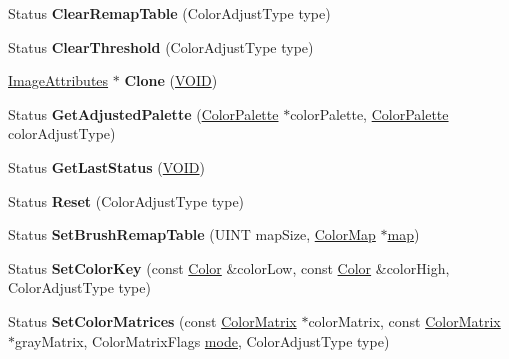 \begin{DoxyCompactItemize}
\mbox{\label{class_image_attributes_a4a15e9e5a04abcd2dfbecfa09874d5a8}} 
Status {\bfseries Clear\+Remap\+Table} (Color\+Adjust\+Type type)
\item 
\mbox{\label{class_image_attributes_a601f2de20c9ddf9874c4c9119f71d0cd}} 
Status {\bfseries Clear\+Threshold} (Color\+Adjust\+Type type)
\item 
\mbox{\label{class_image_attributes_a3e050de95c44a8679f8db5400ccea822}} 
\hyperlink{class_image_attributes}{Image\+Attributes} $\ast$ {\bfseries Clone} (\hyperlink{interfacevoid}{V\+O\+ID})
\item 
\mbox{\label{class_image_attributes_a39f376c67afe6931a408aacba825324c}} 
Status {\bfseries Get\+Adjusted\+Palette} (\hyperlink{struct_color_palette}{Color\+Palette} $\ast$color\+Palette, \hyperlink{struct_color_palette}{Color\+Palette} color\+Adjust\+Type)
\item 
\mbox{\label{class_image_attributes_a3f734c8d14814d0e84504d5a589ead19}} 
Status {\bfseries Get\+Last\+Status} (\hyperlink{interfacevoid}{V\+O\+ID})
\item 
\mbox{\label{class_image_attributes_a0e9d0061a0db770ee5ba42a024e99533}} 
Status {\bfseries Reset} (Color\+Adjust\+Type type)
\item 
\mbox{\label{class_image_attributes_a681f1463a75d1dfafb1dde0d7cea5cfc}} 
Status {\bfseries Set\+Brush\+Remap\+Table} (U\+I\+NT map\+Size, \hyperlink{struct_color_map}{Color\+Map} $\ast$\hyperlink{classmap}{map})
\item 
\mbox{\label{class_image_attributes_ad6ed9de7d729a234f518ab4b53ccccba}} 
Status {\bfseries Set\+Color\+Key} (const \hyperlink{struct_color}{Color} \&color\+Low, const \hyperlink{struct_color}{Color} \&color\+High, Color\+Adjust\+Type type)
\item 
\mbox{\label{class_image_attributes_ab2e06c6ff99ba9b1fda63a11039b7abc}} 
Status {\bfseries Set\+Color\+Matrices} (const \hyperlink{struct_color_matrix}{Color\+Matrix} $\ast$color\+Matrix, const \hyperlink{struct_color_matrix}{Color\+Matrix} $\ast$gray\+Matrix, Color\+Matrix\+Flags \hyperlink{interfacevoid}{mode}, Color\+Adjust\+Type type)

\end{DoxyCompactItemize}
